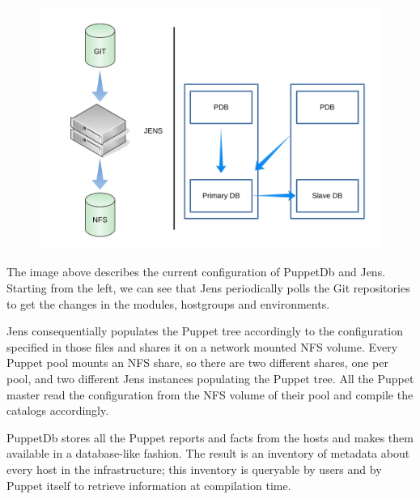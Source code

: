 \begin{figure}[H]
\includegraphics[width=\textwidth,height=\textheight,keepaspectratio]{ConfigurationManagement/Infrastructure_jens_pdb.jpg}
\end{figure}

The image above describes the current configuration of PuppetDb and Jens.
Starting from the left, we can see that Jens periodically polls the Git
repositories to get the changes in the modules, hostgroups and
environments.

Jens consequentially populates the Puppet tree accordingly to the
configuration specified in those files and shares it on a network mounted
NFS volume. Every Puppet pool mounts an NFS share, so there are two
different shares, one per pool, and two different Jens instances
populating the Puppet tree. All the Puppet master read the configuration
from the NFS volume of their pool and compile the catalogs accordingly.

PuppetDb stores all the Puppet reports and facts from the hosts and makes
them available in a database-like fashion. The result is an inventory of
metadata about every host in the infrastructure; this inventory is
queryable by users and by Puppet itself to retrieve information at
compilation time.
